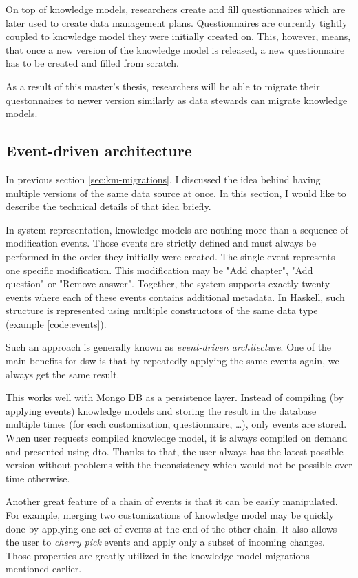 On top of knowledge models, researchers create and fill questionnaires which are later used to create data management plans.
Questionnaires are currently tightly coupled to knowledge model they were initially created on.
This, however, means, that once a new version of the knowledge model is released, a new questionnaire has to be created and filled from scratch.

As a result of this master's thesis, researchers will be able to migrate their questonnaires to newer version similarly as data stewards can migrate knowledge models.

\subsection{Event-driven architecture}\label{sec:event-driven-architecture}

In previous section \ref{sec:km-migrations}, I discussed the idea behind having multiple versions of the same data source at once.
In this section,  I would like to describe the technical details of that idea briefly.

In system representation, knowledge models are nothing more than a sequence of modification events.
Those events are strictly defined and must always be performed in the order they initially were created.
The single event represents one specific modification.
This modification may be "Add chapter", "Add question" or "Remove answer".
Together, the system supports exactly twenty events where each of these events contains additional metadata.
In Haskell, such structure is represented using multiple constructors of the same data type (example \ref{code:events}).


Such an approach is generally known as \textit{event-driven architecture}\cite{mdm-event-architecture}.
One of the main benefits for \gls{dsw} is that by repeatedly applying the same events again, we always get the same result.

This works well with Mongo DB as a persistence layer.
Instead of compiling (by applying events) knowledge models and storing the result in the database multiple times (for each customization, questionnaire, \dots), only events are stored.
When user requests compiled knowledge model, it is always compiled on demand and presented using \gls{dto}.
Thanks to that, the user always has the latest possible version without problems with the inconsistency which would not be possible over time otherwise.

Another great feature of a chain of events is that it can be easily manipulated.
For example, merging two customizations of knowledge model may be quickly done by applying one set of events at the end of the other chain.
It also allows the user to \textit{cherry pick} events and apply only a subset of incoming changes.
Those properties are greatly utilized in the knowledge model migrations mentioned earlier.
